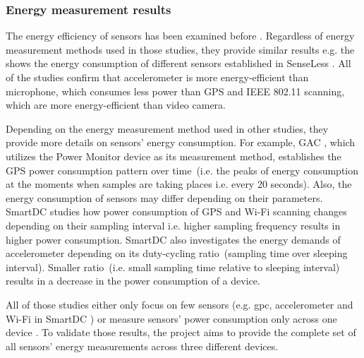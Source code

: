 \subsubsection{Energy measurement results}
\hspace{10pt} The energy efficiency of sensors has been examined before \cite{benabdesslem:senseless} \cite{constandache:localization} \cite{wang:eemss} \cite{chon:smartdc}. Regardless of energy measurement methods used in those studies, they provide similar results e.g. the  shows the energy consumption of different sensors established in SenseLess \cite{benabdesslem:senseless}. All of the studies confirm that accelerometer is more energy-efficient than microphone, which consumes less power than GPS and IEEE 802.11 scanning, which are more energy-efficient than video camera.


Depending on the energy measurement method used in other studies, they provide more details on sensors' energy consumption. For example, GAC \cite{youssef:gac}, which utilizes the Power Monitor device as its measurement method, establishes the GPS power consumption pattern over time\ (i.e. the peaks of energy consumption at the moments when samples are taking places i.e. every 20 seconds). Also, the energy consumption of sensors may differ depending on their parameters. SmartDC \cite{chon:smartdc} studies how power consumption of GPS and Wi-Fi scanning changes depending on their sampling interval i.e. higher sampling frequency results in higher power consumption. SmartDC also investigates the energy demands of accelerometer depending on its duty-cycling ratio\ (sampling time over sleeping interval). Smaller ratio\ (i.e. small sampling time relative to sleeping interval) results in a decrease in the power consumption of a device.  

All of those studies either only focus on few sensors (e.g. gpc, accelerometer and Wi-Fi in SmartDC \cite{chon:smartdc}) or measure sensors' power consumption only across one device \cite{benabdesslem:senseless}. To validate those results, the project aims to provide the complete set of all sensors' energy measurements across three different devices. 
	
